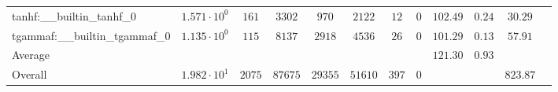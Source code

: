 \begin{tabular}{|l|c|c|c|c|c|c|c|c|c|c|c|}
tanhf:\_\_builtin\_tanhf\_0               & $ 1.571 \cdot 10^{0}  $ & $ 161    $ & $ 3302  $ & $ 970   $ & $ 2122  $ & $ 12  $ & $ 0 $ & $ 102.49      $ & $ 0.24    $ & $ 30.29   $ \\
tgammaf:\_\_builtin\_tgammaf\_0           & $ 1.135 \cdot 10^{0}  $ & $ 115    $ & $ 8137  $ & $ 2918  $ & $ 4536  $ & $ 26  $ & $ 0 $ & $ 101.29      $ & $ 0.13    $ & $ 57.91   $ \\
\hline
Average                                   & $                     $ & $        $ & $       $ & $       $ & $       $ & $     $ & $   $ & $ 121.30      $ & $ 0.93    $ & $         $ \\
\hline
Overall                                   & $ 1.982 \cdot 10^{1}  $ & $ 2075   $ & $ 87675 $ & $ 29355 $ & $ 51610 $ & $ 397 $ & $ 0 $ & $             $ & $         $ & $ 823.87  $ \\
\hline
\end{tabular}
